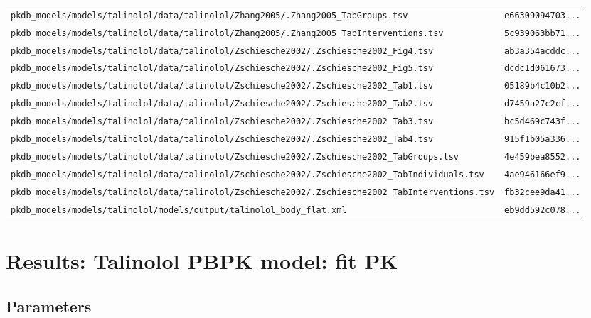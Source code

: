 \begin{longtable}{ll}
\texttt{pkdb\_models/models/talinolol/data/talinolol/Zhang2005/.Zhang2005\_TabGroups.tsv} & \texttt{e66309094703...} \\
\texttt{pkdb\_models/models/talinolol/data/talinolol/Zhang2005/.Zhang2005\_TabInterventions.tsv} & \texttt{5c939063bb71...} \\
\texttt{pkdb\_models/models/talinolol/data/talinolol/Zschiesche2002/.Zschiesche2002\_Fig4.tsv} & \texttt{ab3a354acddc...} \\
\texttt{pkdb\_models/models/talinolol/data/talinolol/Zschiesche2002/.Zschiesche2002\_Fig5.tsv} & \texttt{dcdc1d061673...} \\
\texttt{pkdb\_models/models/talinolol/data/talinolol/Zschiesche2002/.Zschiesche2002\_Tab1.tsv} & \texttt{05189b4c10b2...} \\
\texttt{pkdb\_models/models/talinolol/data/talinolol/Zschiesche2002/.Zschiesche2002\_Tab2.tsv} & \texttt{d7459a27c2cf...} \\
\texttt{pkdb\_models/models/talinolol/data/talinolol/Zschiesche2002/.Zschiesche2002\_Tab3.tsv} & \texttt{bc5d469c743f...} \\
\texttt{pkdb\_models/models/talinolol/data/talinolol/Zschiesche2002/.Zschiesche2002\_Tab4.tsv} & \texttt{915f1b05a336...} \\
\texttt{pkdb\_models/models/talinolol/data/talinolol/Zschiesche2002/.Zschiesche2002\_TabGroups.tsv} & \texttt{4e459bea8552...} \\
\texttt{pkdb\_models/models/talinolol/data/talinolol/Zschiesche2002/.Zschiesche2002\_TabIndividuals.tsv} & \texttt{4ae946166ef9...} \\
\texttt{pkdb\_models/models/talinolol/data/talinolol/Zschiesche2002/.Zschiesche2002\_TabInterventions.tsv} & \texttt{fb32cee9da41...} \\
\texttt{pkdb\_models/models/talinolol/models/output/talinolol\_body\_flat.xml} & \texttt{eb9dd592c078...} \\
\end{longtable}

\section{Results: Talinolol PBPK model: fit PK}

\subsection{Parameters}


